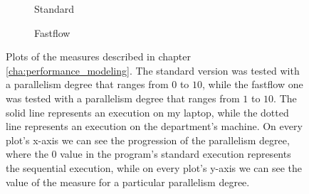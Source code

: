 \begin{figure}
        \begin{subfigure}{0.33\textwidth}
            \caption{Standard}
            \label{fig:efficiency_standard}
        \end{subfigure}
        \begin{subfigure}{0.33\textwidth}
            \caption{Fastflow}
            \label{fig:efficiency_fastflow}
        \end{subfigure}
        \caption{Plots of the measures described in chapter \ref{cha:performance_modeling}. The standard
        version was tested with a parallelism degree that ranges from $0$ to $10$, while the fastflow one was
        tested with a parallelism degree that ranges from $1$ to $10$. The solid line represents an execution
        on my laptop, while the dotted line represents an execution on the department's machine. On every
        plot's x-axis we can see the progression of the parallelism degree, where the $0$
        value in the program's standard execution represents the sequential execution, while on every plot's
        y-axis we can see the value of the measure for a particular parallelism degree.}
        \label{fig:performances}
    \end{figure}
    \newpage
    \setcounter{page}{2}
